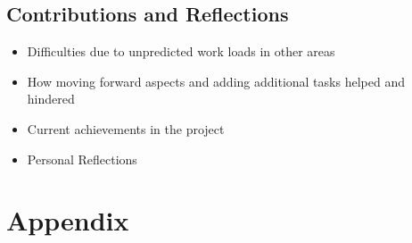 \documentclass[a4paper]{article}
\begin{document}
\subsection{Contributions and Reflections}
\begin{itemize}
    \item Difficulties due to unpredicted work loads in other areas
    \item How moving forward aspects and adding additional tasks helped and hindered
    \item Current achievements in the project
    \item Personal Reflections
\end{itemize}


\section{Appendix}

\nocite{worldsOverview}


\end{document}

